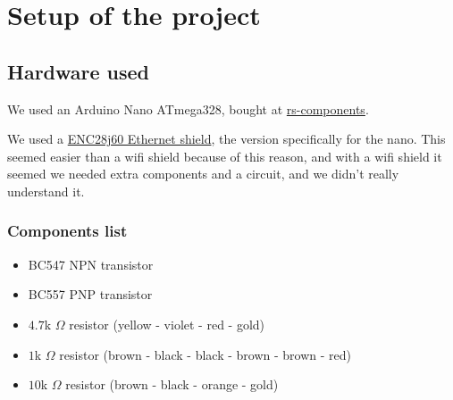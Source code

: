\documentclass{article}
\begin{document}
	
	\tableofcontents
	\newpage
	
	\section{Setup of the project}
		\subsection{Hardware used}
		We used an Arduino Nano ATmega328, bought at \href{http://nl.rs-online.com/}{rs-components}.
		
		We used a \href{http://www.mijn-gadgets.nl/Webwinkel-Product-157562595/ENC28J60-Ethernet-Shield-Network-Module-V1.0-For-Arduino-Nano.html}{ENC28j60 Ethernet shield}, the version specifically for the nano. This seemed easier than a wifi shield because of this reason, and with a wifi shield it seemed we needed extra components and a circuit, and we didn't really understand it.
		
		\subsubsection{Components list}
			\begin{itemize}
				\item BC547 NPN transistor
				\item BC557 PNP transistor
				\item $4.7$k $\Omega$ resistor (yellow - violet - red - gold)
				\item $1$k $\Omega$ resistor (brown - black - black - brown - brown - red)
				\item $10$k $\Omega$ resistor (brown - black - orange - gold)
			\end{itemize}
	
\end{document}
